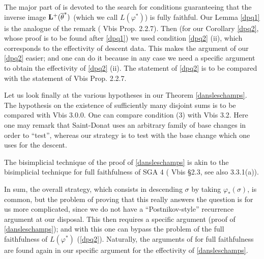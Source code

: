 The major part of \cite{SGA4b} is devoted to the search for conditions
guaranteeing that
the inverse image ${\bf L}^+(\overline{\theta}^{\ast})$ (which we call
$L(\varphi ^{\ast})$) is
fully faithful. Our Lemma \ref{dpq1} is the analogue of the remark
(\cite{SGA4b} Vbis Prop. 2.2.7).
Then (for our Corollary \ref{dpq2},
whose proof is to be found
after \ref{dpq1})
we used condition \ref{dpq2} (ii), which
corresponds to the effectivity
of descent data.
This makes the argument of our \ref{dpq2} easier; and one can do it
because in any case
we need a specific argument to obtain the effectivity
of
\ref{dpq2} (ii). The statement of \ref{dpq2} is to be compared with the
statement of
\cite{SGA4b} Vbis Prop. 2.2.7.

Let us look finally at the various hypotheses in our Theorem
\ref{dansleschamps}.
The hypothesis on the existence of sufficiently many disjoint sums is to
be compared with
\cite{SGA4b} Vbis 3.0.0. One can compare condition (3) with
\cite{SGA4b} Vbis 3.2.
Here one may remark that Saint-Donat uses an arbitrary family of
base changes in order to
``test'', whereas our strategy is to test with the
base change which one
uses for the descent.

The bisimplicial technique of the proof of \ref{dansleschamps}
is akin to the
bisimplicial technique for full faithfulness of SGA 4 (\cite{SGA4b}
Vbis \S 2.3, see also
3.3.1(a)).

In sum, the overall strategy, which consists in
descending $\sigma$ by taking
$\varphi _{\ast}(\sigma )$,
is common, but the problem of proving that this really answers the
question is for us more
complicated, since we do not have a ``Postnikov-style'' recurrence
argument at our disposal. This then requires
a specific argument (proof of \ref{dansleschamps}); and with
this one can bypass the
problem of the full faithfulness of $L(\varphi ^{\ast})$ (\ref{dpq2}).
Naturally, the
arguments of \cite{SGA4b} for full faithfulness are found again in
our specific argument
for the effectivity of
\ref{dansleschamps}.
